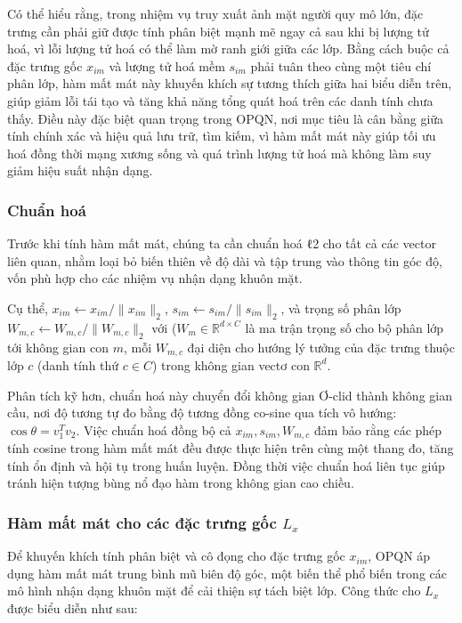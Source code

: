 Có thể hiểu rằng, trong nhiệm vụ truy xuất ảnh mặt người quy mô lớn, đặc trưng cần phải giữ được tính phân biệt mạnh mẽ ngay cả sau khi bị lượng tử hoá, vì lỗi lượng tử hoá có thể làm mờ ranh giới giữa các lớp. Bằng cách buộc cả đặc trưng gốc $x_{im}$ và lượng tử hoá mềm $s_{im}$ phải tuân theo cùng một tiêu chí phân lớp, hàm mất mát này khuyến khích sự tương thích giữa hai biểu diễn trên, giúp giảm lỗi tái tạo và tăng khả năng tổng quát hoá trên các danh tính chưa thấy. Điều này đặc biệt quan trọng trong OPQN, nơi mục tiêu là cân bằng giữa tính chính xác và hiệu quả lưu trữ, tìm kiếm, vì hàm mất mát này giúp tối ưu hoá đồng thời mạng xương sống và quá trình lượng tử hoá mà không làm suy giảm hiệu suất nhận dạng.

\subsubsection{Chuẩn hoá}
Trước khi tính hàm mất mát, chúng ta cần chuẩn hoá ℓ2 cho tất cả các vector liên quan, nhằm loại bỏ biến thiên về độ dài và tập trung vào thông tin góc độ, vốn phù hợp cho các nhiệm vụ nhận dạng khuôn mặt. 

Cụ thể, $ x_{im} \leftarrow x_{im} / \|x_{im}\|_2 $, $s_{im} \leftarrow s_{im} / \|s_{im}\|_2$, và trọng số phân lớp $W_{m,c} \leftarrow W_{m,c} / \|W_{m,c}\|_2$ với ($W_m \in \mathbb{R}^{d \times C}$ là ma trận trọng số cho bộ phân lớp tới không gian con $m$, mỗi $W_{m,c}$ đại diện cho hướng lý tưởng của đặc trưng thuộc lớp $c$ (danh tính thứ $c \in C$) trong không gian vectơ con $\mathbb{R}^d$. 

Phân tích kỹ hơn, chuẩn hoá này chuyển đổi không gian Ơ-clid thành không gian cầu, nơi độ tương tự đo bằng độ tương đồng co-sine qua tích vô hướng: $\cos \theta = v^T_1 v_2$. Việc chuẩn hoá đồng bộ cả $x_{im}, s_{im}, W_{m,c}$ đảm bảo rằng các phép tính cosine trong hàm mất mát đều được thực hiện trên cùng một thang đo, tăng tính ổn định và hội tụ trong huấn luyện. Đồng thời việc chuẩn hoá liên tục giúp tránh hiện tượng bùng nổ đạo hàm trong không gian cao chiều.

\subsubsection{Hàm mất mát cho các đặc trưng gốc $L_x$}
Để khuyến khích tính phân biệt và cô đọng cho đặc trưng gốc $x_{im}$, OPQN áp dụng hàm mất mát trung bình mũ biên độ góc, một biến thể phổ biến trong các mô hình nhận dạng khuôn mặt để cải thiện sự tách biệt lớp. Công thức cho $L_x$ được biểu diễn như sau:

